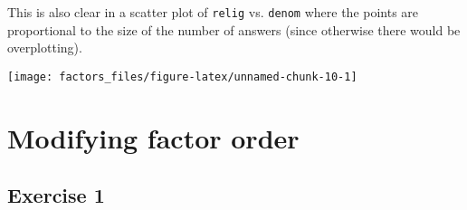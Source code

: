 \documentclass[]{book}
\newenvironment{Shaded}{\begin{snugshade}}{\end{snugshade}}
\newcommand{\CommentTok}[1]{\textcolor[rgb]{0.56,0.35,0.01}{\textit{#1}}}
\newcommand{\DataTypeTok}[1]{\textcolor[rgb]{0.13,0.29,0.53}{#1}}
\newcommand{\DecValTok}[1]{\textcolor[rgb]{0.00,0.00,0.81}{#1}}
\newcommand{\KeywordTok}[1]{\textcolor[rgb]{0.13,0.29,0.53}{\textbf{#1}}}
\newcommand{\NormalTok}[1]{#1}
\newcommand{\OperatorTok}[1]{\textcolor[rgb]{0.81,0.36,0.00}{\textbf{#1}}}
\newcommand{\StringTok}[1]{\textcolor[rgb]{0.31,0.60,0.02}{#1}}
\theoremstyle{definition}
\theoremstyle{definition}
\theoremstyle{definition}
\theoremstyle{remark}
\begin{document}
\begin{Shaded}
\end{Shaded}

This is also clear in a scatter plot of \texttt{relig} vs.
\texttt{denom} where the points are proportional to the size of the
number of answers (since otherwise there would be overplotting).

\begin{Shaded}
\end{Shaded}

\begin{center}\texttt{[image: factors\_files/figure-latex/unnamed-chunk-10-1]} \end{center}

\hypertarget{modifying-factor-order}{%
\section{Modifying factor order}\label{modifying-factor-order}}

\hypertarget{exercise-1-39}{%
\subsection{Exercise 1}\label{exercise-1-39}}
\end{document}

